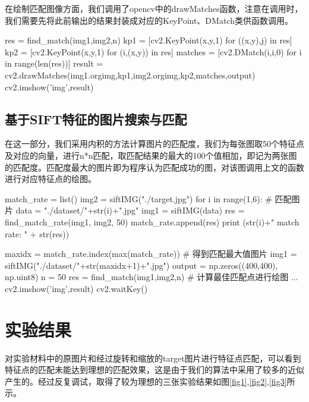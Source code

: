 \documentclass{article}
\begin{document}
在绘制匹配图像方面，我们调用了opencv中的drawMatches函数，注意在调用时，我们需要先将此前输出的结果封装成对应的KeyPoint、DMatch类供函数调用。
\begin{python}
res = find_match(img1,img2,n)
kp1 = [cv2.KeyPoint(x,y,1) for ((x,y),j) in res]
kp2 = [cv2.KeyPoint(x,y,1) for (i,(x,y)) in res]
matches = [cv2.DMatch(i,i,0) for i in range(len(res))]
result = cv2.drawMatches(img1.orgimg,kp1,img2.orgimg,kp2,matches,output)
cv2.imshow('img',result)
\end{python}



\subsection{基于SIFT特征的图片搜索与匹配}

在这一部分，我们采用内积的方法计算图片的匹配度，我们为每张图取50个特征点及对应的向量，进行n*n匹配，取匹配结果的最大的100个值相加，即记为两张图的匹配度。匹配度最大的图片即为程序认为匹配成功的图，对该图调用上文的函数进行对应特征点的绘图。

\begin{python}
match_rate = list()
img2 = siftIMG("./target.jpg")
for i in range(1,6):                   # 匹配图片
    data = "./dataset/"+str(i)+".jpg"
    img1 = siftIMG(data)
    res = find_match_rate(img1, img2, 50)
    match_rate.append(res)
    print (str(i)+" match rate: " + str(res))

maxidx = match_rate.index(max(match_rate))  # 得到匹配最大值图片
img1 = siftIMG("./dataset/"+str(maxidx+1)+".jpg")
output = np.zeros((400,400), np.uint8)
n = 50
res = find_match(img1,img2,n)               # 计算最佳匹配点进行绘图
...
cv2.imshow('img',result)
cv2.waitKey()
\end{python}


\section{实验结果}

对实验材料中的原图片和经过旋转和缩放的target图片进行特征点匹配，可以看到特征点的匹配未能达到理想的匹配效果，这是由于我们的算法中采用了较多的近似产生的。经过反复调试，取得了较为理想的三张实验结果如图\ref{fig1},\ref{fig2},\ref{fig3}所示。
\end{document}
